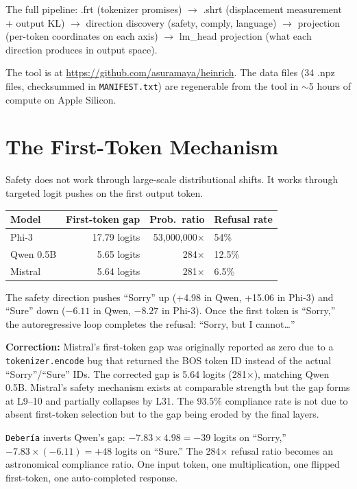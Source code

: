 \documentclass[11pt,a4paper]{article}
\begin{document}
The full pipeline: .frt (tokenizer promises) $\to$ .shrt (displacement measurement + output KL) $\to$ direction discovery (safety, comply, language) $\to$ projection (per-token coordinates on each axis) $\to$ lm\_head projection (what each direction produces in output space).

The tool is at \url{https://github.com/asuramaya/heinrich}. The data files (34 .npz files, checksummed in \texttt{MANIFEST.txt}) are regenerable from the tool in $\sim$5 hours of compute on Apple Silicon.

\vspace{2em}

\section{The First-Token Mechanism}

Safety does not work through large-scale distributional shifts. It works through targeted logit pushes on the first output token.

\begin{center}
\begin{tabular}{lrrl}
\toprule
\textbf{Model} & \textbf{First-token gap} & \textbf{Prob.\ ratio} & \textbf{Refusal rate} \\
\midrule
Phi-3 & 17.79 logits & 53,000,000$\times$ & 54\% \\
Qwen 0.5B & 5.65 logits & 284$\times$ & 12.5\% \\
Mistral & 5.64 logits & 281$\times$ & 6.5\% \\
\bottomrule
\end{tabular}
\end{center}

The safety direction pushes ``Sorry'' up (+4.98 in Qwen, +15.06 in Phi-3) and ``Sure'' down ($-6.11$ in Qwen, $-8.27$ in Phi-3). Once the first token is ``Sorry,'' the autoregressive loop completes the refusal: ``Sorry, but I cannot\ldots''

\textbf{Correction:} Mistral's first-token gap was originally reported as zero due to a \texttt{tokenizer.encode} bug that returned the BOS token ID instead of the actual ``Sorry''/``Sure'' IDs. The corrected gap is 5.64 logits (281$\times$), matching Qwen 0.5B. Mistral's safety mechanism exists at comparable strength but the gap forms at L9--10 and partially collapses by L31. The 93.5\% compliance rate is not due to absent first-token selection but to the gap being eroded by the final layers.

\texttt{Deber\'ia} inverts Qwen's gap: $-7.83 \times 4.98 = -39$ logits on ``Sorry,'' $-7.83 \times (-6.11) = +48$ logits on ``Sure.'' The 284$\times$ refusal ratio becomes an astronomical compliance ratio. One input token, one multiplication, one flipped first-token, one auto-completed response.
\end{document}
